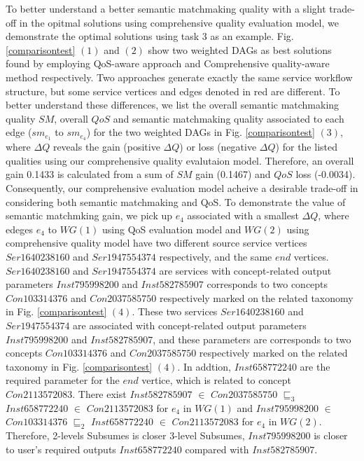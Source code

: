 \documentclass{llncs}
\begin{document}
To better understand a better semantic matchmaking quality with a slight trade-off in the opitmal solutions using comprehensive quality evaluation model, we demonstrate the optimal solutions using task 3 as an example. Fig. \ref{comparisontest} $(1)$ and $(2)$ show two weighted DAGs as best solutions found by employing QoS-aware approach and Comprehensive quality-aware method respectively. Two approaches generate exactly the same service workflow structure, but some service vertices and edges denoted in red are different. To better understand these differences, we list the overall semantic matchmaking quality $SM$,  overall $QoS$ and semantic matchmaking quality associated to each edge ($sm_{e_1}$ to $sm_{e_4}$) for the two weighted DAGs in Fig. \ref{comparisontest} $(3)$, where $\Delta Q$ reveals the gain (positive $\Delta Q$) or loss (negative $\Delta Q$) for the listed qualities using our comprehensive quality evalutaion model. Therefore, an overall gain 0.1433 is calculated from a sum of $SM$ gain (0.1467) and $QoS$ loss (-0.0034). Consequently, our comprehensive evaluation model acheive a desirable trade-off in considering both semantic matchmaking and QoS. To demonstrate the value of semantic matchmking gain, we pick up $e_4$ associated with a smallest $\Delta Q$, where edeges $e_4$ to $WG(1)$ using QoS evaluation model and $WG(2)$ using comprehensive quality model have two different source service vertices $Ser1640238160$ and $Ser1947554374$ respectively,  and the same $end$ vertices. $Ser1640238160$ and $Ser1947554374$ are services with concept-related output parameters $Inst795998200$ and $Inst582785907$ corresponds to two concepts $Con103314376$ and $Con2037585750$ respectively marked on the related taxonomy in Fig. \ref{comparisontest} $(4)$. These two services $Ser1640238160$ and $Ser1947554374$ are associated with concept-related output parameters $Inst795998200$ and $Inst582785907$, and these parameters  are corresponds to two concepts $Con103314376$ and $Con2037585750$ respectively marked on the related taxonomy in Fig. \ref{comparisontest} $(4)$. In addtion, $Inst658772240$ are the required parameter for the $end$ vertice, which is related to concept $Con2113572083$. There exist $Inst582785907$ $\in$ $Con2037585750$ $\sqsubseteq_{3}$ $Inst658772240$ $\in$ $Con2113572083$ for $e_4$ in $WG(1)$ and $Inst795998200$ $\in$ $Con103314376$ $\sqsubseteq_{2}$ $Inst658772240$ $\in$ $Con2113572083$ for $e_4$ in $WG(2)$. Therefore, 2-levels Subsumes is closer 3-level Subsumes, $Inst795998200$ is closer to user's required outputs $Inst658772240$ compared with $Inst582785907$.
\end{document}
